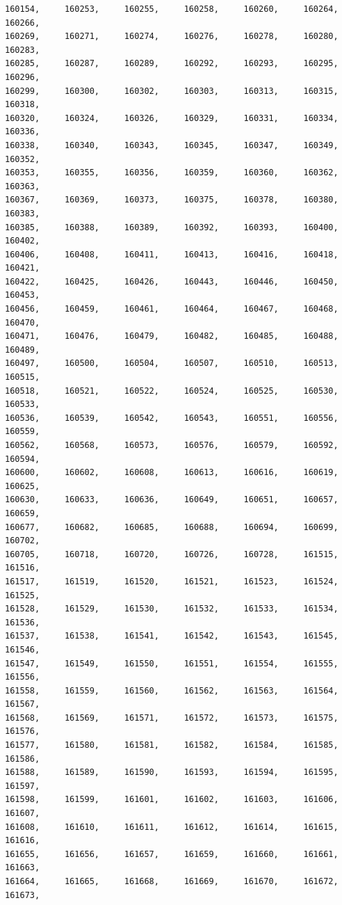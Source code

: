\documentclass[a4paper,11pt]{report}
\begin{document}
\begin{verbatim}
160154,     160253,     160255,     160258,     160260,     160264,     160266,
160269,     160271,     160274,     160276,     160278,     160280,     160283,
160285,     160287,     160289,     160292,     160293,     160295,     160296,
160299,     160300,     160302,     160303,     160313,     160315,     160318,
160320,     160324,     160326,     160329,     160331,     160334,     160336,
160338,     160340,     160343,     160345,     160347,     160349,     160352,
160353,     160355,     160356,     160359,     160360,     160362,     160363,
160367,     160369,     160373,     160375,     160378,     160380,     160383,
160385,     160388,     160389,     160392,     160393,     160400,     160402,
160406,     160408,     160411,     160413,     160416,     160418,     160421,
160422,     160425,     160426,     160443,     160446,     160450,     160453,
160456,     160459,     160461,     160464,     160467,     160468,     160470,
160471,     160476,     160479,     160482,     160485,     160488,     160489,
160497,     160500,     160504,     160507,     160510,     160513,     160515,
160518,     160521,     160522,     160524,     160525,     160530,     160533,
160536,     160539,     160542,     160543,     160551,     160556,     160559,
160562,     160568,     160573,     160576,     160579,     160592,     160594,
160600,     160602,     160608,     160613,     160616,     160619,     160625,
160630,     160633,     160636,     160649,     160651,     160657,     160659,
160677,     160682,     160685,     160688,     160694,     160699,     160702,
160705,     160718,     160720,     160726,     160728,     161515,     161516,
161517,     161519,     161520,     161521,     161523,     161524,     161525,
161528,     161529,     161530,     161532,     161533,     161534,     161536,
161537,     161538,     161541,     161542,     161543,     161545,     161546,
161547,     161549,     161550,     161551,     161554,     161555,     161556,
161558,     161559,     161560,     161562,     161563,     161564,     161567,
161568,     161569,     161571,     161572,     161573,     161575,     161576,
161577,     161580,     161581,     161582,     161584,     161585,     161586,
161588,     161589,     161590,     161593,     161594,     161595,     161597,
161598,     161599,     161601,     161602,     161603,     161606,     161607,
161608,     161610,     161611,     161612,     161614,     161615,     161616,
161655,     161656,     161657,     161659,     161660,     161661,     161663,
161664,     161665,     161668,     161669,     161670,     161672,     161673,

\end{verbatim}
\end{document}
